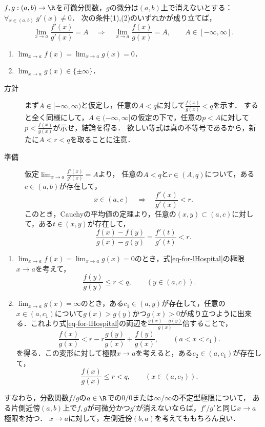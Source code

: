 \documentclass[uplatex,dvipdfmx]{jsarticle}
\begin{document}
\begin{theorem}
    $f,g:(a,b)\to\R$を可微分関数，$g$の微分は$(a,b)$上で消えないとする：$\forall_{x\in(a,b)}\;g'(x)\ne0$．
    次の条件(1),(2)のいずれかが成り立てば，
    \[\lim_{x\to a}\frac{f'(x)}{g'(x)}=A\quad\Rightarrow\quad\lim_{x\to a}\frac{f(x)}{g(x)}=A,\qquad A\in[-\infty,\infty].\]
    \begin{enumerate}
        \item $\lim_{x\to a}f(x)=\lim_{x\to a}g(x)=0$．
        \item $\lim_{x\to a}g(x)\in\{\pm\infty\}$．
    \end{enumerate}
\end{theorem}
\begin{Proof}\mbox{}
    \begin{description}
        \item[方針] まず$A\in[-\infty,\infty)$と仮定し，任意の$A<q$に対して$\frac{f(x)}{g(x)}< q$を示す．
        すると全く同様にして，$A\in(-\infty,\infty]$の仮定の下で，任意の$p<A$に対して$p<\frac{f(x)}{g(x)}$が示せ，結論を得る．
        欲しい等式は真の不等号であるから，新たに$A<r<q$を取ることに注意．
        \item[準備]
        仮定$\lim_{x\to a}\frac{f'(x)}{g'(x)}=A$より，
        任意の$A<q$と$r\in(A,q)$について，ある$c\in(a,b)$が存在して，
        \[x\in(a,c)\quad\Rightarrow\quad\frac{f'(x)}{g'(x)}<r.\]
        このとき，Cauchyの平均値の定理より，任意の$(x,y)\subset(a,c)$に対して，ある$t\in(x,y)$が存在して，
        \begin{equation}\label{eq-for-lHospital}
            \frac{f(x)-f(y)}{g(x)-g(y)}=\frac{f'(t)}{g'(t)}<r.
        \end{equation}
    \end{description}
    \begin{enumerate}
        \item $\lim_{x\to a}f(x)=\lim_{x\to a}g(x)=0$のとき，式\ref{eq-for-lHospital}の極限$x\to a$を考えて，
        \[\frac{f(y)}{g(y)}\le r<q,\qquad(y\in(a,c)).\]
        \item $\lim_{x\to a}g(x)=\infty$のとき，ある$c_1\in(a,y)$が存在して，任意の$x\in(a,c_1)$について$g(x)>g(y)$かつ$g(x)>0$が成り立つように出来る．これより式\ref{eq-for-lHospital}の両辺を$\frac{g(x)-g(y)}{g(x)}$倍することで，
        \[\frac{f(x)}{g(x)}<r-r\frac{g(y)}{g(x)}+\frac{f(y)}{g(x)},\qquad(a<x<c_1).\]
        を得る．この変形に対して極限$x\to a$を考えると，ある$c_2\in(a,c_1)$が存在して，
        \[\frac{f(x)}{g(x)}\le r<q,\qquad(x\in(a,c_2)).\]
    \end{enumerate}
\end{Proof}
\begin{remarks}
    すなわち，分数関数$f/g$の$a\in\R$での$0/0$または$\infty/\infty$の不定型極限について，
    ある片側近傍$(a,b)$上で$f,g$が可微分かつ$g'$が消えないならば，$f'/g'$と同じ$x\to a$極限を持つ．
    $x\to a$に対して，左側近傍$(b,a)$を考えてももちろん良い．
\end{remarks}
\end{document}
